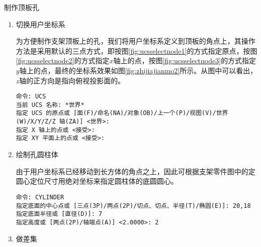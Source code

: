\begin{procedure}
\begin{figure}[htbp]
\centering
\begin{floatrow}[2]
\end{floatrow}
\end{figure}

\item 制作顶板孔

\begin{enumerate}
\item 切换用户坐标系

为方便制作支架顶板上的孔，我们将用户坐标系定义到顶板的角点上，其操作方法是采用默认的三点方式，即按图\ref{fig:ucsselectnode1}的方式指定原点，按图\ref{fig:ucsselectnode2}的方式指定$x$轴上的点，按图\ref{fig:ucsselectnode3}的方式指定$y$轴上的点，最终的坐标系效果如图\ref{fig:zhijiajianmo2}所示。从图中可以看出，$z$轴的正方向是指向俯视投影面的。


\begin{lstlisting}
命令: UCS
当前 UCS 名称: *世界*
指定 UCS 的原点或 [面(F)/命名(NA)/对象(OB)/上一个(P)/视图(V)/世界(W)/X/Y/Z/Z 轴(ZA)] <世界>:
指定 X 轴上的点或 <接受>:
指定 XY 平面上的点或 <接受>:
\end{lstlisting}


\item 绘制孔圆柱体

由于用户坐标系已经移动到长方体的角点之上，因此可根据支架零件图中的定圆心定位尺寸用绝对坐标来指定圆柱体的底圆圆心。

\begin{lstlisting}
命令: CYLINDER
指定底面的中心点或 [三点(3P)/两点(2P)/切点、切点、半径(T)/椭圆(E)]: 20,18
指定底面半径或 [直径(D)]: 7
指定高度或 [两点(2P)/轴端点(A)] <2.0000>: 2
\end{lstlisting}


\item 做差集


\end{enumerate}
\end{procedure}
